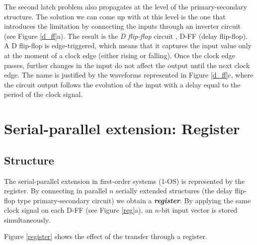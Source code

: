 
The second latch problem also propagates at the level of the primary-secondary structure. The solution we can come up with at this level is the one that introduces the limitation by connecting the inputs through an inverter circuit (see Figure \ref{d_ff}a). The result is the \textit{D flip-flop} circuit , D-FF (delay flip-flop).  A D flip-flop is edge-triggered, which means that it captures the input value only at the moment of a clock edge (either rising or falling). Once the clock edge passes, further changes in the input do not affect the output until the next clock edge.  The name is justified by the waveforms represented in Figure \ref{d_ff}c, where the circuit output follows the evolution of the input with a delay equal to the period of the clock signal.

\section{Serial-parallel extension: Register}

\subsection{Structure}

The serial-parallel extension in first-order systems (1-OS) is represented by the register. By connecting in parallel $n$ serially extended structures (the delay flip-flop type primary-secondary circuit) we obtain a {\bf {\em register}}. By applying the same clock signal on each D-FF (see Figure \ref{reg}a), an $n$-bit input vector is stored simultaneously. 


Figure \ref{register} shows the effect of the transfer through a register.

